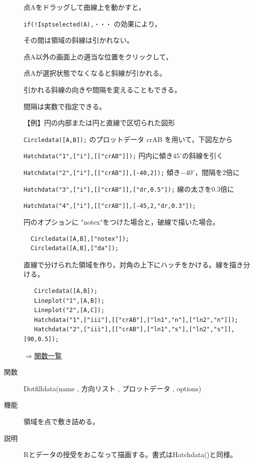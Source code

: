 \documentclass[papersize,a4paper,12pt,uplatex]{jsarticle}
\begin{document}
\begin{description}
点Aをドラッグして曲線上を動かすと，

\verb|if(!Isptselected(A),・・・| の効果により，

その間は領域の斜線は引かれない。

点A以外の画面上の適当な位置をクリックして，

点Aが選択状態でなくなると斜線が引かれる。

引かれる斜線の向きや間隔を変えることもできる。

間隔は実数で指定できる。

\vspace{\baselineskip}
【例】円の内部または円と直線で区切られた図形

\verb|Circledata([A,B]);|  のプロットデータ crAB を用いて，下図左から

\verb|Hatchdata("1",["i"],[["crAB"]]);| 円内に傾き$45^{\circ}$の斜線を引く

\verb|Hatchdata("2",["i"],[["crAB"]],[-40,2]);| 傾き$-40^{\circ}$，間隔を2倍に

\verb|Hatchdata("3",["i"],[["crAB"]],["dr,0.5"]);|  線の太さを0.3倍に

\verb|Hatchdata("4",["i"],[["crAB"]],[-45,2,"dr,0.3"]);| 

  
 
円のオプションに "notex"をつけた場合と，破線で描いた場合。
\begin{verbatim}
  Circledata([A,B],["notex"]);
  Circledata([A,B],["da"]);
 \end{verbatim}

\hspace{10mm}    

直線で分けられた領域を作り，対角の上下にハッチをかける。線を描き分ける。
\begin{verbatim}
   Circledata([A,B]);
   Lineplot("1",[A,B]);
   Lineplot("2",[A,C]);
   Hatchdata("1",["iii"],[["crAB"],["ln1","n"],["ln2","n"]]);
   Hatchdata("2",["iii"],[["crAB"],["ln1","s"],["ln2","s"]],[90,0.5]);
\end{verbatim}

\hspace{40mm}   

\begin{flushright}  \hyperlink{functionlist}{$\Rightarrow$関数一覧}\end{flushright}

\vspace{\baselineskip}
\hypertarget{dotfilldata}{}
\item[関数]  Dotfilldata(name , 方向リスト , プロットデータ , options)
\item[機能]  領域を点で敷き詰める。
\item[説明]  Rとデータの授受をおこなって描画する。書式はHatchdata()と同様。


\end{description}
\end{document}

